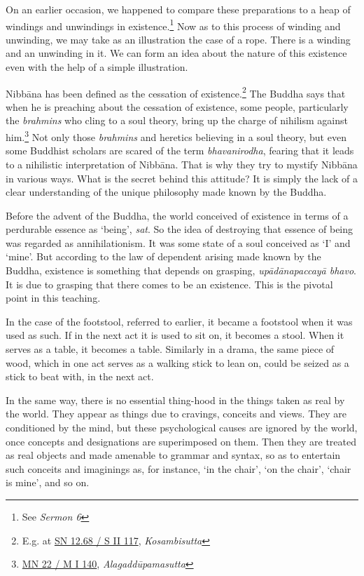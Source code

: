 On an earlier occasion, we happened to compare these preparations to a heap of windings and unwindings in existence.\footnote{See \emph{Sermon 6}} Now as to this process of winding and unwinding, we may take as an illustration the case of a rope. There is a winding and an unwinding in it. We can form an idea about the nature of this existence even with the help of a simple illustration.

Nibbāna has been defined as the cessation of existence.\footnote{E.g. at \href{https://suttacentral.net/sn12.68/pli/ms}{SN 12.68 / S II 117}, \emph{Kosambisutta}} The Buddha says that when he is preaching about the cessation of existence, some people, particularly the \emph{brahmins} who cling to a soul theory, bring up the charge of nihilism against him.\footnote{\href{https://suttacentral.net/mn22/pli/ms}{MN 22 / M I 140}, \emph{Alagaddūpamasutta}} Not only those \emph{brahmins} and heretics believing in a soul theory, but even some Buddhist scholars are scared of the term \emph{bhavanirodha}, fearing that it leads to a nihilistic interpretation of Nibbāna. That is why they try to mystify Nibbāna in various ways. What is the secret behind this attitude? It is simply the lack of a clear understanding of the unique philosophy made known by the Buddha.

Before the advent of the Buddha, the world conceived of existence in terms of a perdurable essence as `being', \emph{sat}. So the idea of destroying that essence of being was regarded as annihilationism. It was some state of a soul conceived as `I' and `mine'. But according to the law of dependent arising made known by the Buddha, existence is something that depends on grasping, \emph{upādānapaccayā bhavo}. It is due to grasping that there comes to be an existence. This is the pivotal point in this teaching.

In the case of the footstool, referred to earlier, it became a footstool when it was used as such. If in the next act it is used to sit on, it becomes a stool. When it serves as a table, it becomes a table. Similarly in a drama, the same piece of wood, which in one act serves as a walking stick to lean on, could be seized as a stick to beat with, in the next act.

In the same way, there is no essential thing-hood in the things taken as real by the world. They appear as things due to cravings, conceits and views. They are conditioned by the mind, but these psychological causes are ignored by the world, once concepts and designations are superimposed on them. Then they are treated as real objects and made amenable to grammar and syntax, so as to entertain such conceits and imaginings as, for instance, `in the chair', `on the chair', `chair is mine', and so on.

